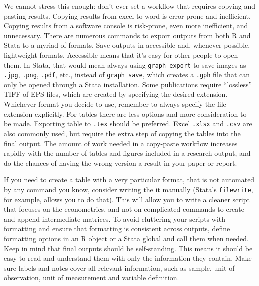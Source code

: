 We cannot stress this enough: don't ever set a workflow that requires copying and pasting results.
Copying results from excel to word is error-prone and inefficient.
Copying results from a software console is risk-prone, even more inefficient, and unnecessary.
There are numerous commands to export outputs from both R and Stata to a myriad of formats.
Save outputs in accessible and, whenever possible, lightweight formats.
Accessible means that it's easy for other people to open them.
In Stata, that would mean always using \texttt{graph export} to save images as \texttt{.jpg}, \texttt{.png}, \texttt{.pdf}, etc., 
instead of \texttt{graph save}, which creates a \texttt{.gph} file that can only be opened through a Stata installation.
Some publications require ``lossless'' TIFF of EPS files, which are created by specifying the desired extension.
Whichever format you decide to use, remember to always specify the file extension explicitly.
For tables there are less options and more consideration to be made.
Exporting table to \texttt{.tex} should be preferred. 
Excel \texttt{.xlsx} and \texttt{.csv} are also commonly used, 
but require the extra step of copying the tables into the final output.
The amount of work needed in a copy-paste workflow increases rapidly with the number of tables and figures included in a research output, 
and do the chances of having the wrong version a result in your paper or report.


If you need to create a table with a very particular format, that is not automated by any command you know, consider writing the it manually 
(Stata's \texttt{filewrite}, for example, allows you to do that).
This will allow you to write a cleaner script that focuses on the econometrics, and not on complicated commands to create and append intermediate matrices.
To avoid cluttering your scripts with formatting and ensure that formatting is consistent across outputs,
define formatting options in an R object or a Stata global and call them when needed.
Keep in mind that final outputs should be self-standing.
This means it should be easy to read and understand them with only the information they contain.
Make sure labels and notes cover all relevant information, such as sample, unit of observation, unit of measurement and variable definition.

